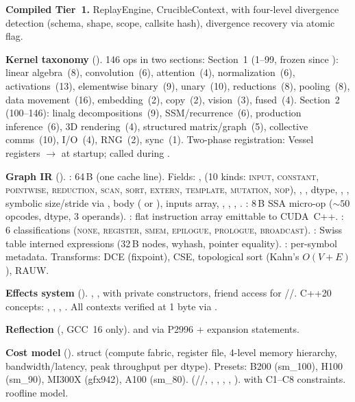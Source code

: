\textbf{Compiled Tier~1.}
ReplayEngine, CrucibleContext,  with four-level divergence detection (schema, shape, scope, callsite hash), divergence recovery via  atomic flag.

\textbf{Kernel taxonomy} ().
146 ops in two sections:
Section~1 (1--99, frozen since ): linear algebra~(8), convolution~(6), attention~(4), normalization~(6), activations~(13), elementwise binary~(9), unary~(10), reductions~(8), pooling~(8), data movement~(16), embedding~(2), copy~(2), vision~(3), fused~(4).
Section~2 (100--146): linalg decompositions~(9), SSM/recurrence~(6), production inference~(6), 3D rendering~(4), structured matrix/graph~(5), collective comms~(10), I/O~(4), RNG~(2), sync~(1).
Two-phase registration: Vessel registers  $\to$  at startup;  called during .

\textbf{Graph IR} ().
: 64\,B (one cache line).
Fields: ,  (10 kinds: \textsc{input, constant, pointwise, reduction, scan, sort, extern, template, mutation, nop}), , , dtype, , , symbolic size/stride via , body ( or ), inputs array, , , , .
: 8\,B SSA micro-op (${\sim}50$ opcodes, dtype, 3  operands).
: flat instruction array emittable to CUDA~C++.
: 6 classifications (\textsc{none, register, smem, epilogue, prologue, broadcast}).
: Swiss table interned expressions (32\,B nodes, wyhash, pointer equality).
: per-symbol metadata.
Transforms: DCE (fixpoint), CSE, topological sort (Kahn's $O(V{+}E)$), RAUW.

\textbf{Effects system} ().
, ,  with private constructors, friend access for //.
C++20 concepts: , , , .
All contexts verified at 1 byte via .

\textbf{Reflection} (, GCC~16 only).
 and  via P2996  + expansion statements.

\textbf{Cost model} ().
 struct (compute fabric, register file, 4-level memory hierarchy, bandwidth/latency, peak throughput per dtype).
Presets: B200 (sm\_100), H100 (sm\_90), MI300X (gfx942), A100 (sm\_80).
 (//, , , , , ).
 with C1--C8 constraints.
 roofline model.

